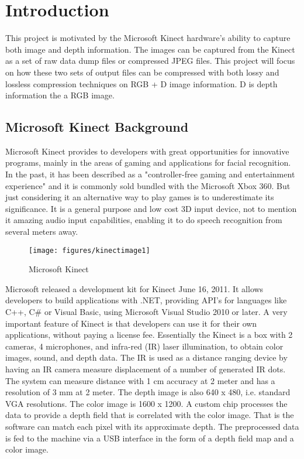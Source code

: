 \section{Introduction} \label{sec:intro}

This project is motivated by the Microsoft Kinect hardware's ability to capture both image and depth information. 
The images can be captured from the Kinect as a set of raw data dump files or compressed JPEG files. 
This project will focus on how these two sets of output files can be compressed with both lossy and lossless compression techniques on RGB + D image information. D is depth information the a RGB image.

\subsection{Microsoft Kinect Background}

Microsoft Kinect provides to developers with great opportunities for innovative programs, mainly in the areas of gaming and applications for facial recognition.
In the past, it has been described as a "controller-free gaming and entertainment experience" and it is commonly sold bundled with the Microsoft Xbox 360. But just considering it an alternative way to play games is to underestimate its significance. It is a general purpose and low cost 3D input device, not to mention it amazing audio input 
capabilities, enabling it to do speech recognition from several meters away.

\begin{figure}[hbt]
  \center
        \texttt{[image: figures/kinectimage1]}
        \caption{Microsoft Kinect}
  \label{fig:kinect}
\end{figure}

Microsoft released a development kit for Kinect June 16, 2011.
It allows developers to build applications with .NET, providing API's for languages like C++, C\# or Visual Basic, using Microsoft Visual Studio 2010 or later. 
A very important feature of Kinect is that developers can use it for their own applications, without paying a license fee.
Essentially the Kinect is a box with 2 cameras, 4 microphones, and infra-red (IR) laser illumination, to obtain color images, sound, and depth data. 
The IR is used as a distance ranging device by having an IR camera measure displacement of a number of generated IR dots. 
The system can measure distance with 1 cm accuracy at 2 meter and has a resolution of 3 mm at 2 meter. 
The depth image is also 640 x 480, i.e. standard VGA resolutions. 
The color image is 1600 x 1200. 
A custom chip processes the data to provide a depth field that is correlated with the color image. 
That is the software can match each pixel with its approximate depth. The preprocessed data is fed to the machine via a USB interface in the form of a depth field map and a color image.

